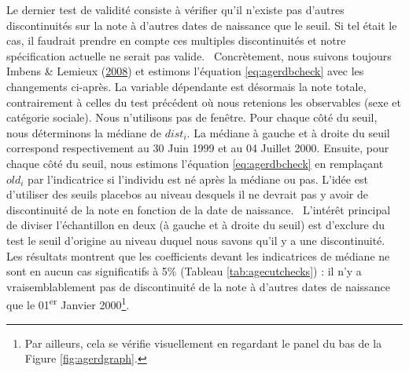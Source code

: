 \documentclass[
]{book}
\begin{document}
\quad Le dernier test de validité consiste à vérifier qu'il n'existe pas d'autres discontinuités sur la note à d'autres dates de naissance que le seuil. Si tel était le cas, il faudrait prendre en compte ces multiples discontinuités et notre spécification actuelle ne serait pas valide.~
Concrètement, nous suivons toujours Imbens \& Lemieux (\protect\hyperlink{ref-IMB:LEM:08}{2008}) et estimons l'équation \eqref{eq:agerdbcheck} avec les changements ci-après. La variable dépendante est désormais la note totale, contrairement à celles du test précédent où nous retenions les observables (sexe et catégorie sociale). Nous n'utilisons pas de fenêtre. Pour chaque côté du seuil, nous déterminons la médiane de \(dist_i\). La médiane à gauche et à droite du seuil correspond respectivement au 30 Juin 1999 et au 04 Juillet 2000. Ensuite, pour chaque côté du seuil, nous estimons l'équation \eqref{eq:agerdbcheck} en remplaçant \(old_i\) par l'indicatrice si l'individu est né après la médiane ou pas. L'idée est d'utiliser des seuils placebos au niveau desquels il ne devrait pas y avoir de discontinuité de la note en fonction de la date de naissance.~
L'intérêt principal de diviser l'échantillon en deux (à gauche et à droite du seuil) est d'exclure du test le seuil d'origine au niveau duquel nous savons qu'il y a une discontinuité. Les résultats montrent que les coefficients devant les indicatrices de médiane ne sont en aucun cas significatifs à 5\% (Tableau \ref{tab:agecutchecks}) : il n'y a vraisemblablement pas de discontinuité de la note à d'autres dates de naissance que le 01\textsuperscript{er} Janvier 2000\footnote{Par ailleurs, cela se vérifie visuellement en regardant le panel du bas de la Figure \ref{fig:agerdgraph}.}.

\begingroup\fontsize{8}{10}\selectfont
\end{document}
